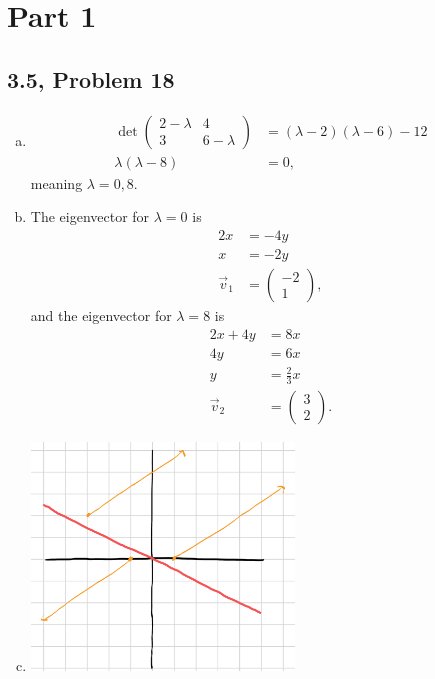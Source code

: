 \documentclass[10pt]{mypackage}
\begin{document}
\RaggedRight
\section{Part 1}%
\subsection{3.5, Problem 18}%
\begin{enumerate}[(a)]
  \item 
    \begin{align*}
      \det \begin{pmatrix}2-\lambda & 4 \\ 3 & 6-\lambda\end{pmatrix} &= \left(\lambda - 2\right)\left(\lambda - 6\right) - 12\\
      \lambda\left(\lambda - 8\right) &= 0,
    \end{align*}
    meaning $\lambda = 0,8$.
  \item The eigenvector for $\lambda = 0$ is
    \begin{align*}
      2x &= -4y\\
      x &= -2y\\
      \vec{v}_1 &= \begin{pmatrix}-2 \\ 1\end{pmatrix},
    \end{align*}
    and the eigenvector for $\lambda = 8$ is
    \begin{align*}
      2x + 4y &= 8x\\
      4y &= 6x\\
      y &= \frac{2}{3}x\\
      \vec{v}_2 &= \begin{pmatrix}3\\2\end{pmatrix}.
    \end{align*}
  \item \hfill
    \begin{center}
      \includegraphics[width=7cm]{images/3_5_18c.png}

\end{center}
\end{enumerate}
\end{document}
